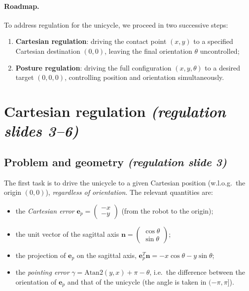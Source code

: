 \documentclass[11pt,a4paper]{article}
\theoremstyle{plain}
\theoremstyle{definition}
\theoremstyle{remark}
\begin{document}
\paragraph{Roadmap.}
To address regulation for the unicycle, we proceed in two successive steps:
\begin{enumerate}[leftmargin=*,nosep]
\item \textbf{Cartesian regulation}: driving the contact point $(x,y)$ to a specified Cartesian destination $(0,0)$, leaving the final orientation $\theta$ uncontrolled;
\item \textbf{Posture regulation}: driving the full configuration $(x,y,\theta)$ to a desired target $(0,0,0)$, controlling position and orientation simultaneously.
\end{enumerate}

\section{Cartesian regulation \emph{(regulation slides 3--6)}}

\subsection{Problem and geometry \emph{(regulation slide 3)}}

The first task is to drive the unicycle to a given Cartesian position (w.l.o.g.\ the origin $(0,0)$), \emph{regardless of orientation}. The relevant quantities are:
\begin{itemize}[leftmargin=*,nosep]
\item the \emph{Cartesian error} $\bm e_p=\begin{pmatrix}-x\\-y\end{pmatrix}$ (from the robot to the origin);
\item the unit vector of the sagittal axis $\bm n=\begin{pmatrix}\cos\theta\\ \sin\theta\end{pmatrix}$;
\item the projection of $\bm e_p$ on the sagittal axis, $\bm e_p^T\bm n=-x\cos\theta-y\sin\theta$;
\item the \emph{pointing error} $\gamma=\mathrm{Atan2}(y,x)+\pi-\theta$, i.e.\ the difference between the orientation of $\bm e_p$ and that of the unicycle (the angle is taken in $(-\pi,\pi]$).
\end{itemize}
\end{document}
